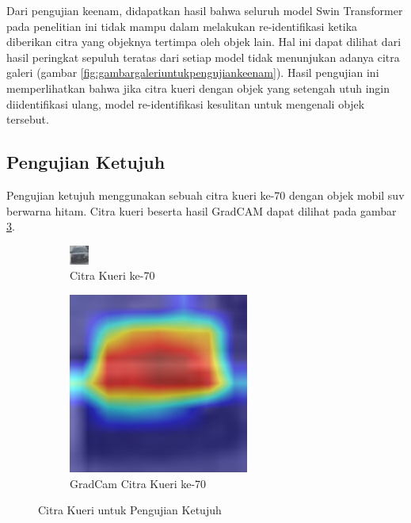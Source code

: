 Dari pengujian keenam, didapatkan hasil bahwa seluruh model Swin Transformer pada penelitian ini tidak mampu dalam melakukan 
re-identifikasi ketika diberikan citra yang objeknya tertimpa oleh objek lain. Hal ini dapat dilihat dari hasil peringkat 
sepuluh teratas dari setiap model tidak menunjukan adanya citra galeri (gambar \ref{fig:gambargaleriuntukpengujiankeenam}). 
Hasil pengujian ini memperlihatkan bahwa jika citra kueri dengan objek yang setengah utuh 
ingin diidentifikasi ulang, model re-identifikasi kesulitan untuk mengenali objek tersebut.

\subsection{Pengujian Ketujuh}

Pengujian ketujuh menggunakan sebuah citra kueri ke-70 dengan objek mobil suv \linebreak berwarna hitam. Citra kueri 
beserta hasil GradCAM dapat dilihat pada gambar \ref{fig:gambarkueriuntukpengujianketujuh}.

\begin{figure}[h!]
  \centering
  \begin{subfigure}{.5\textwidth}
    \centering
    \includegraphics[width=.5\linewidth]{gambar/Que70_114.jpg}
    \caption{Citra Kueri ke-70}
    \label{gambarkuerinomortujuhpuluh}
  \end{subfigure}%
  \begin{subfigure}{.5\textwidth}
    \centering
    \includegraphics[width=.5\linewidth]{gambar/GradCamQue70_114.jpg}
    \caption{GradCam Citra Kueri ke-70}
    \label{gradcamgambarkuerinomortujuhpuluh}
  \end{subfigure}
  \caption{Citra Kueri untuk Pengujian Ketujuh}
  \label{fig:gambarkueriuntukpengujianketujuh}
\end{figure}

